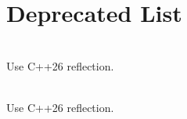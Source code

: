 \chapter{Deprecated List}
\hypertarget{deprecated}{}\label{deprecated}

\begin{DoxyRefList}
\item[Member \doxylink{self_8hpp_a0fd91b8deec89b8d0a02352439b62ded}{UTILS\+\_\+\+FIND\+\_\+\+SELF} ]\hfill \\
\label{deprecated__deprecated000001}%
%
Use C++26 reflection.  
\item[Member \doxylink{self_8hpp_a379c3395d69445241a0099fdaf0e68de}{UTILS\+\_\+\+FIND\+\_\+\+SELF\+\_\+\+TYPE} ]\hfill \\
\label{deprecated__deprecated000002}%
%
Use C++26 reflection. 
\end{DoxyRefList}